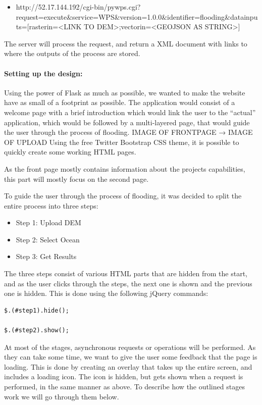 \begin{itemize}
\item http://52.17.144.192/cgi-bin/pywps.cgi?request=execute\&service=WPS\&version=1.0.0\&identifier=flooding\&datainputs=[rasterin=<LINK TO DEM>;vectorin=<GEOJSON AS STRING>]
\end{itemize}

The server will process the request, and return a XML document with links to where the outputs of the process are stored. 

\paragraph{Setting up the design:} Using the power of Flask as much as possible, we wanted to make the website have as small of a footprint as possible. 
The application would consist of a welcome page with a brief introduction which would link the user to the “actual” application, which would be followed by a multi-layered page, that would guide the user through the process of flooding. 
IMAGE OF FRONTPAGE → IMAGE OF UPLOAD
Using the free Twitter Bootstrap CSS theme, it is possible to quickly create some working HTML pages. 

As the front page mostly contains information about the projects capabilities, this part will mostly focus on the second page. 

To guide the user through the process of flooding, it was decided to split the entire process into three steps:
\begin{itemize}
\item Step 1: Upload DEM
\item Step 2: Select Ocean
\item Step 3: Get Results
\end{itemize}
The three steps consist of various HTML parts that are hidden from the start, and as the user clicks through the steps, the next one is shown and the previous one is hidden. This is done using the following jQuery commands:

\begin{lstlisting}
$.(#step1).hide();

$.(#step2).show();
\end{lstlisting}

At most of the stages, asynchronous requests or operations will be performed. As they can take some time, we want to give the user some feedback that the page is loading. This is done by creating an overlay that takes up the entire screen, and includes a loading icon. The icon is hidden, but gets shown when a request is performed, in the same manner as above.
To describe how the outlined stages work we will go through them below. \\

